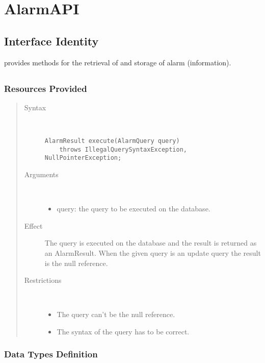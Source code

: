 \section{AlarmAPI}
\label{api:alarm-api}

\subsection{Interface Identity}

\npar {} provides methods for the retrieval of and storage of
alarm (information).

\subsection{}

\subsubsection{Resources Provided}

\begin{quote}
	\begin{description}
		\item[Syntax] \
		\begin{verbatim}
AlarmResult execute(AlarmQuery query)
    throws IllegalQuerySyntaxException, NullPointerException;
		\end{verbatim}
		\item[Arguments] \
		\begin{itemize}
		  \item query: the query to be executed on the database. 
		\end{itemize}
		\item[Effect] The query is executed on the database and the result is returned
		as an AlarmResult. When the given query is an update query the result is the
		null reference.
		\item[Restrictions] \
		\begin{itemize}
		  \item The query can't be the null reference.
		  \item The syntax of the query has to be correct.
		\end{itemize}
	\end{description} 
\end{quote}

\subsubsection{Data Types Definition}

